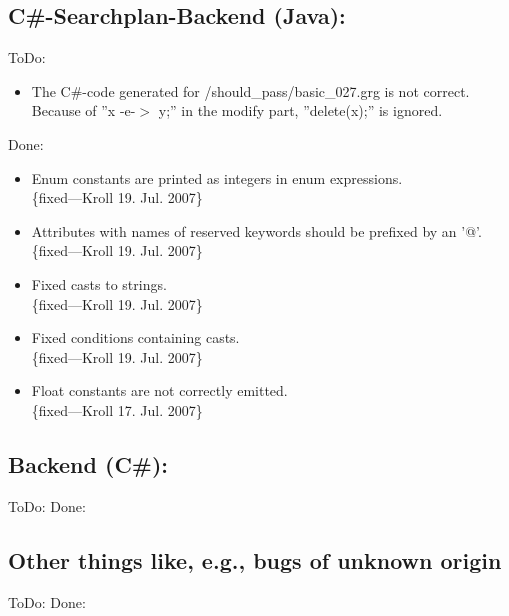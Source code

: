 \documentclass[12pt,a4paper]{article}
\begin{document}
\subsection*{C\#-Searchplan-Backend (Java):}
ToDo:
\begin{itemize}
	\item The C\#-code generated for {/should\_pass/basic\_027.grg} is not correct. Because of ''x -e-$>$ y;'' in the modify part, ''delete(x);'' is ignored.
\end{itemize}
Done:
\begin{itemize}
    \item Enum constants are printed as integers in enum expressions.\\
    \{fixed---Kroll 19. Jul. 2007\}
    \item Attributes with names of reserved keywords should be prefixed by an '@'.\\
    \{fixed---Kroll 19. Jul. 2007\}
    \item Fixed casts to strings.\\
    \{fixed---Kroll 19. Jul. 2007\}
    \item Fixed conditions containing casts.\\
    \{fixed---Kroll 19. Jul. 2007\}
    \item Float constants are not correctly emitted.\\
    \{fixed---Kroll 17. Jul. 2007\}
\end{itemize}


\subsection*{Backend (C\#):}
ToDo:
Done:



\subsection*{Other things like, e.g., bugs of unknown origin}
ToDo:
Done:
\end{document}
